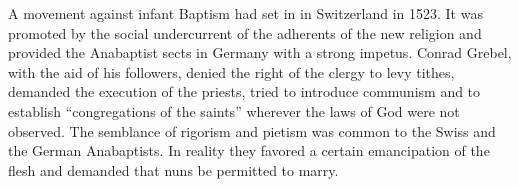 A movement against infant Baptism had set in in Switzerland
in 1523. It was promoted by the social undercurrent of the adherents
of the new religion and provided the Anabaptist sects in Germany
with a strong impetus. Conrad Grebel, with the aid of his followers,
denied the right of the clergy to levy tithes, demanded the execution
of the priests, tried to introduce communism and to establish “congregations
of the saints” wherever the laws of God were not observed.
The semblance of rigorism and pietism was common to the Swiss
and the German Anabaptists. In reality they favored a certain emancipation
of the flesh and demanded that nuns be permitted to marry.
